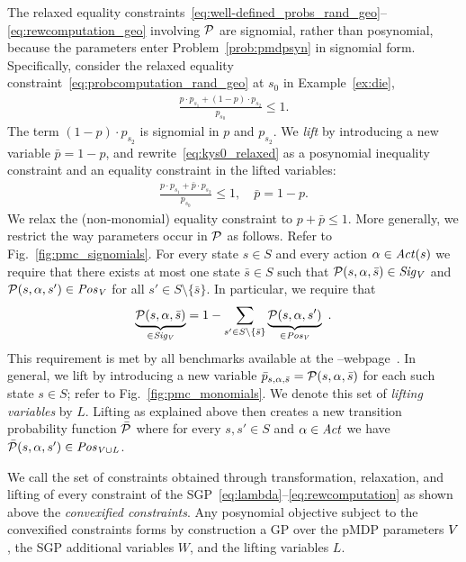 %
The relaxed equality constraints~\eqref{eq:well-defined_probs_rand_geo}--\eqref{eq:rewcomputation_geo} involving $\probmdp$ are signomial, rather than posynomial, because the parameters enter Problem~\ref{prob:pmdpsyn} in signomial form. Specifically, consider the relaxed equality constraint~\eqref{eq:probcomputation_rand_geo} at $s_0$ in Example~\ref{ex:die},
\begin{align}
	\label{eq:kys0_relaxed}
	\frac{p\cdot p_{s_1} + (1-p)\cdot p_{s_2}}{p_{s_0}} \leq 1.
\end{align}
The term $(1-p)\cdot p_{s_2}$ is signomial in $p$ and $p_{s_2}$. We \emph{lift} by introducing a new variable $\bar p = 1-p$, and rewrite~\eqref{eq:kys0_relaxed} as a posynomial inequality constraint and an equality constraint in the lifted variables:
\begin{align}
	\frac{p\cdot p_{s_1} + \bar{p} \cdot p_{s_2}}{p_{s_0}} \leq 1,
	\quad
	\bar p = 1-p.
\end{align}
%
%
We relax the (non-monomial) equality constraint to $p + \bar p \leq 1$. 
More generally, we restrict the way parameters occur in $\probmdp$ as follows. Refer to Fig.~\ref{fig:pmc_signomials}. For every state $s\in S$ and every action $\act\in\Act(s)$ we require that there exists at most one state $\bar s\in S$ such that $\probmdp(s,\act,\bar s)\in\signomis[\Paramvar]$ and $\probmdp(s,\act,s')\in\posys[\Paramvar]$ for all $s'\in S\setminus\{\bar s\}$. In particular, we require that
	\begin{align*}
		\underbrace{\probmdp(s,\act,\bar s)}_{\in\signomis[\Paramvar]} = 1 - \sum_{s'\in S\setminus\{\bar s\}} \underbrace{\probmdp({s,\act,s'})}_{\in\posys[\Paramvar]}\ .
	\end{align*}
This requirement is met by all benchmarks available at the --webpage~\cite{param_website}.
In general, we lift by introducing a new variable $\bar p_{s,\act,\bar s}=\probmdp(s,\act,\bar s)$ for each such state $s\in S$; refer to Fig.~\ref{fig:pmc_monomials}.
We denote this set of \emph{lifting variables} by $L$. Lifting as explained above then creates a new transition probability function $\bar \probmdp$ where for every $s,s'\in S$ and $\act\in \Act$ we have $\bar\probmdp(s,\act,s')\in\posys[\Paramvar\cup L]$. 

We call the set of constraints obtained through transformation, relaxation, and lifting of every constraint of the SGP~\eqref{eq:lambda}--\eqref{eq:rewcomputation} as shown above the \emph{convexified constraints}. 
Any posynomial objective subject to the convexified constraints forms by construction a GP over the pMDP parameters $\Paramvar$, the SGP additional variables $W$, and the lifting variables $L$. 

